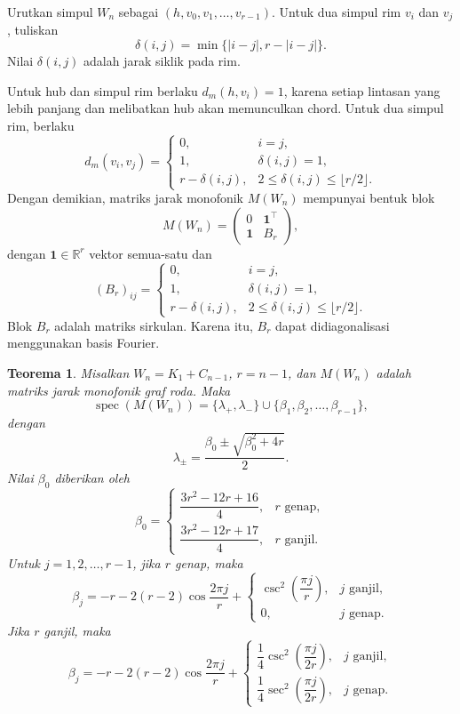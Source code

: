 \documentclass[12pt,a4paper]{article}
\newtheorem{teorema}{Teorema}
\theoremstyle{definition}
\newcommand{\spec}{\operatorname{spec}}
\newcommand{\R}{\mathbb{R}}
\newcommand{\one}{\mathbf{1}}
\begin{document}
Urutkan simpul $W_n$ sebagai $(h,v_0,v_1,\ldots,v_{r-1})$. Untuk dua simpul rim $v_i$ dan $v_j$, tuliskan
\[
  \delta(i,j)=\min\{|i-j|,r-|i-j|\}.
\]
Nilai $\delta(i,j)$ adalah jarak siklik pada rim.

Untuk hub dan simpul rim berlaku $d_m(h,v_i)=1$, karena setiap lintasan yang lebih panjang dan melibatkan hub akan memunculkan chord. Untuk dua simpul rim, berlaku
\[
  d_m(v_i,v_j)=
  \begin{cases}
    0,             & i=j,                                    \\
    1,             & \delta(i,j)=1,                          \\
    r-\delta(i,j), & 2\le \delta(i,j)\le \lfloor r/2\rfloor.
  \end{cases}
\]
Dengan demikian, matriks jarak monofonik $M(W_n)$ mempunyai bentuk blok
\[
  M(W_n)=
  \begin{pmatrix}
    0    & \one^\top \\
    \one & B_r
  \end{pmatrix},
\]
dengan $\one\in\R^r$ vektor semua-satu dan
\[
  (B_r)_{ij}=
  \begin{cases}
    0,             & i=j,                                    \\
    1,             & \delta(i,j)=1,                          \\
    r-\delta(i,j), & 2\le \delta(i,j)\le \lfloor r/2\rfloor.
  \end{cases}
\]
Blok $B_r$ adalah matriks sirkulan. Karena itu, $B_r$ dapat didiagonalisasi menggunakan basis Fourier.

\begin{teorema}
  Misalkan $W_n=K_1+C_{n-1}$, $r=n-1$, dan $M(W_n)$ adalah matriks jarak monofonik graf roda. Maka
  \[
    \spec(M(W_n))=\{\lambda_+,\lambda_-\}\cup\{\beta_1,\beta_2,\ldots,\beta_{r-1}\},
  \]
  dengan
  \[
    \lambda_\pm=\frac{\beta_0\pm\sqrt{\beta_0^2+4r}}{2}.
  \]
  Nilai $\beta_0$ diberikan oleh
  \[
    \beta_0=
    \begin{cases}
      \dfrac{3r^2-12r+16}{4}, & r\text{ genap},  \\[6pt]
      \dfrac{3r^2-12r+17}{4}, & r\text{ ganjil}.
    \end{cases}
  \]
  Untuk $j=1,2,\ldots,r-1$, jika $r$ genap, maka
  \[
    \beta_j
    =
    -r-2(r-2)\cos\frac{2\pi j}{r}
    +
    \begin{cases}
      \csc^2\left(\dfrac{\pi j}{r}\right), & j\text{ ganjil}, \\[6pt]
      0,                                   & j\text{ genap}.
    \end{cases}
  \]
  Jika $r$ ganjil, maka
  \[
    \beta_j
    =
    -r-2(r-2)\cos\frac{2\pi j}{r}
    +
    \begin{cases}
      \dfrac14\csc^2\left(\dfrac{\pi j}{2r}\right), & j\text{ ganjil}, \\[8pt]
      \dfrac14\sec^2\left(\dfrac{\pi j}{2r}\right), & j\text{ genap}.
    \end{cases}
  \]
  \label{thm:spektrum-monofonik-roda}
\end{teorema}
\end{document}
